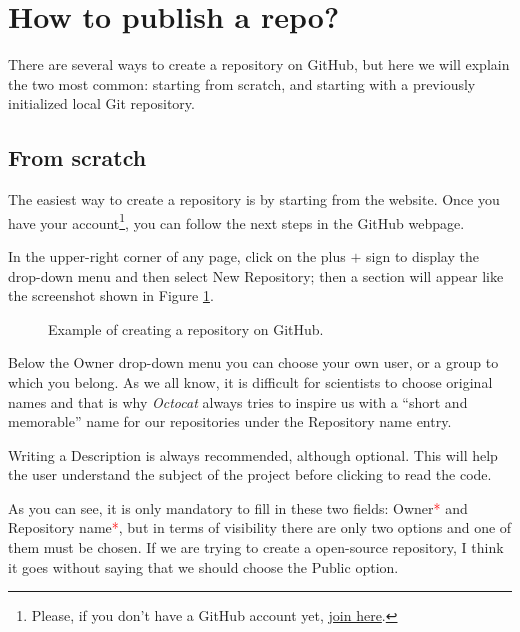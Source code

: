 \section{How to publish a repo?}

There are several ways to create a repository on \textsf{GitHub}, but here we will explain the two most common: starting from scratch, and starting with a previously initialized local Git repository.

\subsection{From scratch}

The easiest way to create a repository is by starting from the website. Once you have your account\footnote{Please, if you don't have a \textsf{GitHub} account yet, \href{https://github.com/join}{join here}.}, you can follow the next steps in the \textsf{GitHub} webpage.

In the upper-right corner of any page, click on the plus $+$ sign to display the drop-down menu and then select \textsf{New Repository}; then a section will appear like the screenshot shown in Figure \ref{fig:Repo}.

\begin{figure} %
    \centering
    \caption{Example of creating a repository on \textsf{GitHub}.}
    \label{fig:Repo}
\end{figure}

Below the \textsf{Owner} drop-down menu you can choose your own user, or a group to which you belong. As we all know, it is difficult for scientists to choose original names and that is why \textit{Octocat} always tries to inspire us with a ``short and memorable'' name for our repositories under the \textsf{Repository name} entry.

Writing a \textsf{Description} is always recommended, although optional. This will help the user understand the subject of the project before clicking to read the code.

As you can see, it is only mandatory to fill in these two fields: \textsf{Owner}\textcolor{red}{*} and \textsf{Repository name}\textcolor{red}{*}, but in terms of visibility there are only two options and one of them must be chosen. If we are trying to create a open-source repository, I think it goes without saying that we should choose the \textsf{Public} option.

